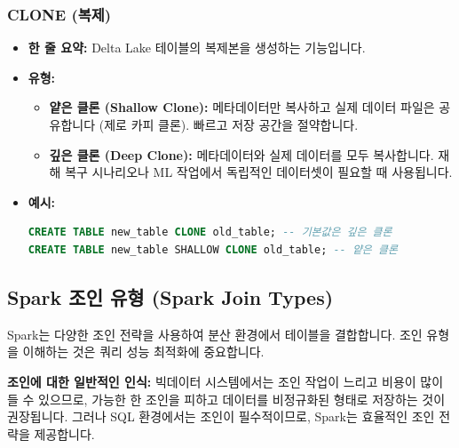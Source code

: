 \documentclass[11pt,a4paper]{article}
\begin{document}
\subsubsection{CLONE (복제)}
\begin{itemize}
    \item \textbf{한 줄 요약:} Delta Lake 테이블의 복제본을 생성하는 기능입니다.
    \item \textbf{유형:}
    \begin{itemize}
        \item \textbf{얕은 클론 (Shallow Clone):} 메타데이터만 복사하고 실제 데이터 파일은 공유합니다 (제로 카피 클론). 빠르고 저장 공간을 절약합니다.
        \item \textbf{깊은 클론 (Deep Clone):} 메타데이터와 실제 데이터를 모두 복사합니다. 재해 복구 시나리오나 ML 작업에서 독립적인 데이터셋이 필요할 때 사용됩니다.
    \end{itemize}
    \item \textbf{예시:}
    \begin{lstlisting}[language=SQL, caption=Delta Lake 클론 예시, label=lst:delta_clone]
CREATE TABLE new_table CLONE old_table; -- 기본값은 깊은 클론
CREATE TABLE new_table SHALLOW CLONE old_table; -- 얕은 클론
\end{lstlisting}
\end{itemize}

\subsection{Spark 조인 유형 (Spark Join Types)}
Spark는 다양한 조인 전략을 사용하여 분산 환경에서 테이블을 결합합니다. 조인 유형을 이해하는 것은 쿼리 성능 최적화에 중요합니다.

\begin{warningbox}
\textbf{조인에 대한 일반적인 인식:}
빅데이터 시스템에서는 조인 작업이 느리고 비용이 많이 들 수 있으므로, 가능한 한 조인을 피하고 데이터를 비정규화된 형태로 저장하는 것이 권장됩니다. 그러나 SQL 환경에서는 조인이 필수적이므로, Spark는 효율적인 조인 전략을 제공합니다.
\end{warningbox}
\end{document}
